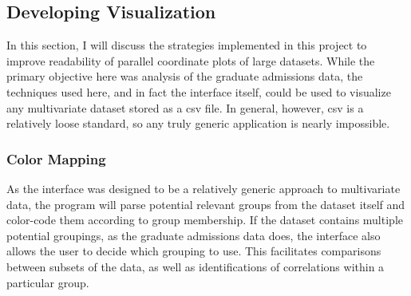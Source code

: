 \documentclass[]{article}
\begin{document}
	\subsection{Developing Visualization}
		\par In this section, I will discuss the strategies implemented in this project to improve readability of parallel coordinate plots of large datasets. While the primary objective here was analysis of the graduate admissions data, the techniques used here, and in fact the interface itself, could be used to visualize any multivariate dataset stored as a csv file. In general, however, csv is a relatively loose standard\cite{csv}, so any truly generic application is nearly impossible.
		\subsubsection{Color Mapping}
			As the interface was designed to be a relatively generic approach to multivariate data, the program will parse potential relevant groups from the dataset itself and color-code them according to group membership. If the dataset contains multiple potential groupings, as the graduate admissions data does, the interface also allows the user to decide which grouping to use. This facilitates comparisons between subsets of the data, as well as identifications of correlations within a particular group.
\end{document}
